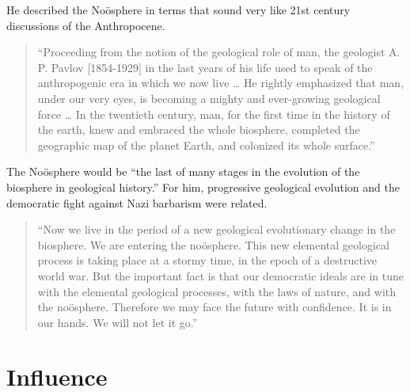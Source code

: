 \documentclass[11pt,a4paper]{article}
\begin{document}
He described the Noösphere in terms that sound very like 21st century
discussions of the Anthropocene.
\begin{quote}  
  “Proceeding from the notion of the geological role of man, the geologist
  A. P. Pavlov [1854-1929] in the last years of his life used to speak of the
  anthropogenic era in which we now live … He rightly emphasized that man,
  under our very eyes, is becoming a mighty and ever-growing geological force
  … In the twentieth century, man, for the first time in the history of the
  earth, knew and embraced the whole biosphere, completed the geographic map
  of the planet Earth, and colonized its whole surface.” \cite[p. 8]{21}
\end{quote}
The Noösphere would be “the last of many stages in the evolution of the
biosphere in geological history.” For him, progressive geological evolution
and the democratic fight against Nazi barbarism were related.
\begin{quote}  
  “Now we live in the period of a new geological evolutionary change in the
  biosphere. We are entering the noösphere. This new elemental geological
  process is taking place at a stormy time, in the epoch of a destructive
  world war. But the important fact is that our democratic ideals are in tune
  with the elemental geological processes, with the laws of nature, and with
  the noösphere. Therefore we may face the future with confidence. It is in
  our hands. We will not let it go.” \cite[p. 10]{21}
\end{quote}

\section*{Influence}
\end{document}
